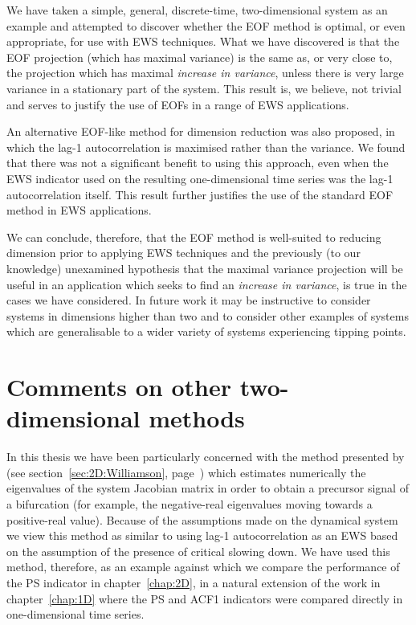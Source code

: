 We have taken a simple, general, discrete-time, two-dimensional system as an example and attempted to discover whether the EOF method is optimal, or even appropriate, for use with EWS techniques. What we have discovered is that the EOF projection (which has maximal variance) is the same as, or very close to, the projection which has maximal \emph{increase in variance}, unless there is very large variance in a stationary part of the system. This result is, we believe, not trivial and serves to justify the use of EOFs in a range of EWS applications. 

An alternative EOF-like method for dimension reduction was also proposed, in which the lag-1 autocorrelation is maximised rather than the variance. We found that there was not a significant benefit to using this approach, even when the EWS indicator used on the resulting one-dimensional time series was the lag-1 autocorrelation itself. This result further justifies the use of the standard EOF method in EWS applications. 

We can conclude, therefore, that the EOF method is well-suited to reducing dimension prior to applying EWS techniques and the previously (to our knowledge) unexamined hypothesis that the maximal variance projection will be useful in an application which seeks to find an \emph{increase in variance}, is true in the cases we have considered. In future work it may be instructive to consider systems in dimensions higher than two and to consider other examples of systems which are generalisable to a wider variety of systems experiencing tipping points. 


\section{Comments on other two-dimensional methods}

In this thesis we have been particularly concerned with the method presented by \cite{williamson2015} (see section~\ref{sec:2D:Williamson}, page~\pageref{sec:2D:Williamson}) which estimates numerically the eigenvalues of the system Jacobian matrix in order to obtain a precursor signal of a bifurcation (for example, the negative-real eigenvalues moving towards a positive-real value). Because of the assumptions made on the dynamical system we view this method as similar to using lag-1 autocorrelation as an EWS based on the assumption of the presence of critical slowing down. We have used this method, therefore, as an example against which we compare the performance of the PS indicator in chapter~\ref{chap:2D}, in a natural extension of the work in chapter~\ref{chap:1D} where the PS and ACF1 indicators were compared directly in one-dimensional time series. 

